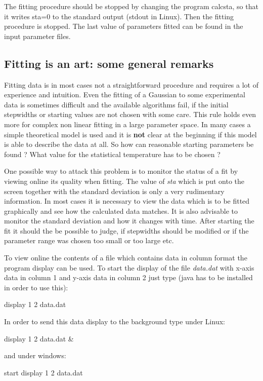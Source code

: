The fitting procedure should be stopped by changing the program {\prg calcsta}, so that it
writes {\prg sta=0} to the standard output (stdout in Linux). Then the fitting
procedure is stopped. The last value of parameters fitted can be found in the
input parameter files.

\subsection{Fitting is an art: some general remarks}

Fitting data is in most cases not a straightforward procedure and requires
a lot of experience and intuition. Even the fitting of a Gaussian to some
experimental data is sometimes difficult and the available algorithms fail,
 if the initial
stepwidths or starting values are not chosen with some care.
This rule holds even more for complex non linear fitting in a large
parameter space. In many cases a simple theoretical model is used
and it is {\bf not} clear at the beginning if this model is able
to describe the data at all. 
So how can reasonable starting parameters be found ? What value
for the statistical temperature has to be chosen ?

One possible way to attack this problem is to monitor the status of a fit
by viewing online its quality when fitting. The value of {\em sta} which is put onto
the screen together with the standard deviation is only a very rudimentary information.
In most cases it is necessary to view the data which is to be fitted graphically and
see how the calculated data matches. It is also advisable to monitor the
standard deviation and how it changes with time. After starting the
fit it should the be possible to judge, if stepwidths should be modified or if
the parameter range was chosen too small or too large etc.

To view online the contents of a file which contains data in column format
the program {\prg display} can be used. To start the display of
the file {\em data.dat} with x-axis data in column 1 and y-axis data
in column 2 just type (java has to be installed in order to use this):

display 1 2 data.dat

In order to send this data display to the background type under Linux:

display 1 2 data.dat \&

and under windows:

start display 1 2 data.dat

